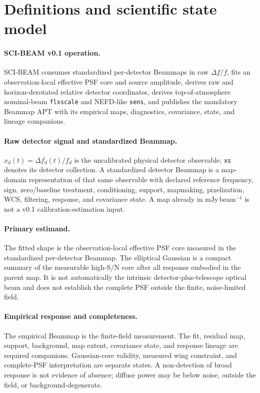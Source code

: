 \section{Definitions and scientific state model}
\label{sec:definitions}

\paragraph{SCI-BEAM v0.1 operation.} SCI-BEAM consumes standardized
per-detector Beammaps in raw $\Delta f/f$, fits an observation-local effective
PSF core and source amplitude, derives raw and horizon-derotated relative
detector coordinates, derives top-of-atmosphere nominal-beam \texttt{flxscale}
and NEFD-like \texttt{sens}, and publishes the mandatory Beammap APT with its
empirical maps, diagnostics, covariance, state, and lineage companions.

\paragraph{Raw detector signal and standardized Beammap.}
$x_d(t)=\Delta f_d(t)/f_d$ is the uncalibrated physical detector observable;
\texttt{xs} denotes its detector collection. A standardized detector Beammap
is a map-domain representation of that same observable with declared
reference frequency, sign, zero/baseline treatment, conditioning, support,
mapmaking, pixelization, WCS, filtering, response, and covariance state. A map
already in $\mathrm{mJy\,beam^{-1}}$ is not a v0.1 calibration-estimation input.

\paragraph{Primary estimand.} The fitted shape is the observation-local
effective PSF core measured in the standardized per-detector Beammap. The
elliptical Gaussian is a compact summary of the measurable high-S/N core after
all response embodied in the parent map. It is not automatically the intrinsic
detector-plus-telescope optical beam and does not establish the complete PSF
outside the finite, noise-limited field.

\paragraph{Empirical response and completeness.} The empirical Beammap is the
finite-field measurement. The fit, residual map, support, background, map
extent, covariance state, and response lineage are required companions.
Gaussian-core validity, measured wing constraint, and complete-PSF
interpretation are separate states. A non-detection of broad response is not
evidence of absence; diffuse power may be below noise, outside the field, or
background-degenerate.

